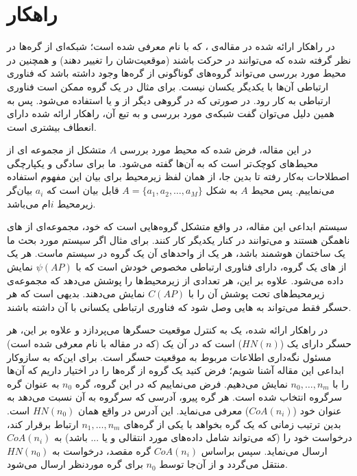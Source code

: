 \section{راهکار  }
در راهکار ارائه شده در مقاله‌ی \cite{}، که با نام  معرفی شده است؛ شبکه‌ای از گره‌ها در نظر گرفته شده که می‌توانند در حرکت باشند (موقعیت‌شان را تغییر دهند) و همچنین در محیط مورد بررسی می‌تواند گروه‌های گوناگونی از گره‌ها وجود داشته باشد که فناوری ارتباطی آن‌ها با یکدیگر یکسان نیست. برای مثال در یک گروه ممکن است فناوری ارتباطی  به کار رود. در صورتی که در گروهی دیگر از  و یا  استفاده می‌شود. پس به همین دلیل می‌توان گفت شبکه‌ی مورد بررسی و به تبع آن، راهکار ارائه شده دارای انعطاف بیشتری است.
\par
در این مقاله، فرض شده که محیط مورد بررسی $A$ متشکل از مجموعه ای از محیط‌های کوچک‌تر است که به آن‌ها  گفته می‌شود. ما برای سادگی و یکپارچگی اصطلاحات به‌کار رفته تا بدین جا، از همان لفظ زیرمحیط برای بیان این مفهوم استفاده می‌نماییم. پس محیط $A$ به شکل $A = \{a_1, a_2, \ldots, a_M\}$ قابل بیان است که $a_i$ بیان‌گر زیرمحیط $i$ام می‌باشد.
\par
سیستم ابداعی این مقاله، در واقع متشکل گروه‌هایی است که خود، مجموعه‌ای از ‌های ناهمگن هستند و می‌توانند در کنار یکدیگر کار کنند.  برای مثال اگر سیستم مورد بحث ما یک ساختمان هوشمند باشد، هر یک از واحد‌های آن یک گروه در سیستم ماست. هر یک از های یک گروه، دارای فناوری ارتباطی مخصوص خودش است که با $\psi(AP)$ نمایش داده می‌شود. علاوه بر این، هر  تعدادی از زیرمحیط‌ها را پوشش می‌دهد که مجموعه‌ی زیرمحیط‌های تحت پوشش آن را با $C(AP)$ نمایش می‌دهند. بدیهی است  که هر حسگر فقط می‌تواند به هایی وصل شود که فناوری ارتباطی یکسانی با آن داشته باشند.
\par
در راهکار ارائه شده، یک  به کنترل موقعیت حسگر‌ها می‌پردازد و علاوه بر این، هر حسگر دارای یک  
($HN(n)$)
 است که در آن یک  (که در مقاله با نام  معرفی شده است) مسئول نگه‌داری اطلاعات مربوط به موقعیت حسگر است. برای این‌که به سازوکار ابداعی این مقاله آشنا شویم؛ فرض کنید یک گروه از گره‌ها را در اختیار داریم که آن‌ها را با $n_0, \ldots, n_m$ نمایش می‌دهیم. فرض می‌نماییم که در این گروه، گره $n_0$ به عنوان گره سرگروه انتخاب شده است. هر گره پیرو، آدرسی که سرگروه به آن نسبت می‌دهد به عنوان  خود ($CoA(n_i)$) معرفی می‌نماید. این آدرس در واقع همان $HN(n_0)$ است. بدین ترتیب زمانی که یک گره بخواهد با یکی از گره‌های $n_1, \ldots, n_m$ ارتباط برقرار کند، درخواست خود را (که می‌تواند شامل داده‌های مورد انتقالی و یا ... باشد) به $CoA(n_i)$ ارسال می‌نماید. سپس براساس $CoA(n_i)$ گره مقصد، درخواست به $HN(n_0)$ منتقل می‌گردد و از آن‌جا توسط $n_0$ برای گره موردنظر ارسال می‌شود.

